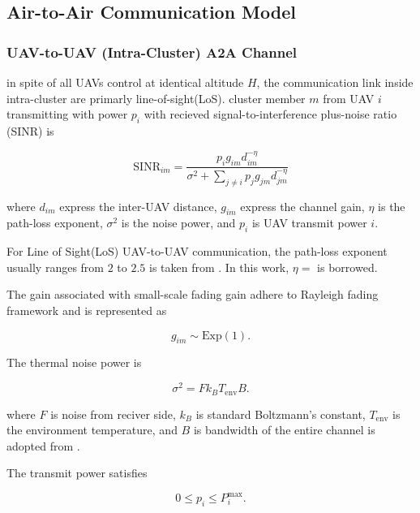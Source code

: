 \documentclass[journal]{IEEEtran}
\begin{document}
\subsection{Air-to-Air Communication Model}

\subsubsection{UAV-to-UAV (Intra-Cluster) A2A Channel}

in spite of all UAVs control at identical altitude $H$, the communication link inside intra-cluster are primarly line-of-sight(LoS). cluster member $m$ from UAV
$i$ transmitting with power $p_i$ with recieved signal-to-interference plus-noise ratio (SINR) is

\begin{equation}
\mathrm{SINR}_{im}
=
\frac{p_i g_{im} d_{im}^{-\eta}}
{\sigma^2+\sum_{j\neq i}
p_j g_{jm} d_{jm}^{-\eta}}
\label{eq:sinr}
\end{equation}

where $d_{im}$ express the inter-UAV distance,
$g_{im}$ express the channel gain,
$\eta$ is the path-loss exponent,
$\sigma^2$ is the noise power, and
$p_i$ is UAV transmit power $i$.

For Line of Sight(LoS) UAV-to-UAV communication, the path-loss exponent
usually ranges from $2$ to $2.5$ is taken from \cite{ref8}. In this work, $\eta=$ is borrowed.

The gain associated with small-scale fading gain adhere to Rayleigh fading framework and is represented as

\begin{equation}
\label{eq:gexp}
g_{im}\sim \mathrm{Exp}(1).
\end{equation}

The thermal noise power is

\begin{equation}
\label{eq:noise}
\sigma^2 = Fk_B T_{\mathrm{env}} B.
\end{equation}

where $F$ is noise from reciver side,
$k_B$ is standard Boltzmann's constant,
$T_{\mathrm{env}}$ is the environment temperature,
and $B$ is bandwidth of the entire channel is adopted from \cite{ref8}.

The transmit power satisfies

\begin{equation}
\label{eq:power_constraint}
0 \le p_i \le P_i^{\max}.
\end{equation}
\end{document}
